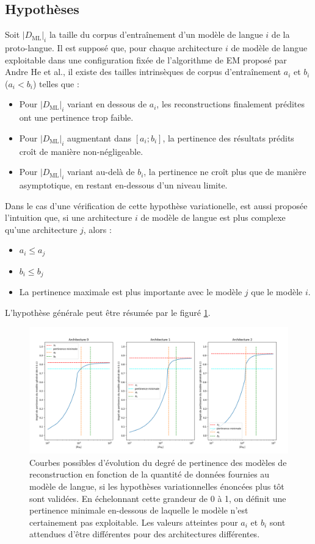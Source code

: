 \documentclass[10pt, french]{article}
\begin{document}
\begin{multicols*}{2}
\section{Hypothèses}

Soit $|D_{\text{ML}}|_i$ la taille du corpus d'entraînement d'un modèle de langue $i$ de la proto-langue.
Il est supposé que, pour chaque architecture $i$ de modèle de langue exploitable dans une configuration fixée de l'algorithme de EM proposé par Andre He et al., il existe des tailles intrinsèques de corpus d'entraînement $a_i$ et $b_i$  ($a_i<b_i$) telles que :
\begin{itemize}
    \item Pour $|D_{\text{ML}}|_i$ variant en dessous de $a_i$, les reconstructions finalement prédites ont une pertinence trop faible.
    \item Pour $|D_{\text{ML}}|_i$ augmentant dans $[a_i; b_i]$, la pertinence des résultats prédits croît de manière non-négligeable.
    \item Pour $|D_{\text{ML}}|_i$ variant au-delà de $b_i$, la pertinence ne croît plus que de manière asymptotique, en restant en-dessous d'un niveau limite. 
\end{itemize}
Dans le cas d'une vérification de cette hypothèse variationelle, est aussi proposée l'intuition que, si une architecture $i$ de modèle de langue est plus complexe qu'une architecture $j$, alors :
\begin{itemize}
    \item $a_i \leq a_j$
    \item $b_i \leq b_j$
    \item La pertinence maximale est plus importante avec le modèle $j$ que le modèle $i$.
\end{itemize}
L'hypothèse générale peut être résumée par le figuré \ref{fig:fighyp}.

\begin{figure}[ht]
  \centering
  \includegraphics[width=\textwidth]{Figure_hyp.png}
  \caption{Courbes possibles d'évolution du degré de pertinence des modèles de reconstruction 
  en fonction de la quantité de données fournies au modèle de langue, si les hypothèses 
  variationnelles énoncées plus tôt sont validées. En échelonnant cette grandeur de 0 à 1, on définit 
  une pertinence minimale en-dessous de laquelle le modèle n'est certainement pas exploitable. 
  Les valeurs atteintes pour $a_i$ et $b_i$ sont attendues d'être différentes pour des 
  architectures différentes.}
  \label{fig:fighyp}
\end{figure}


\end{multicols*}
\end{document}
